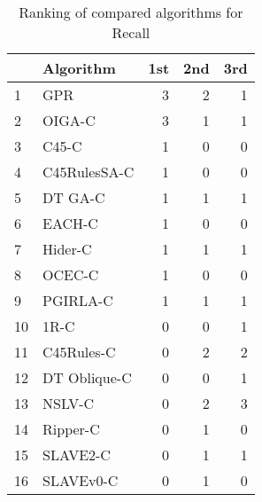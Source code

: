\begin{table}
\footnotesize
\caption{Ranking of compared algorithms for Recall}
\label{tab:places Recall}
\begin{tabular}{llrrr}
\hline
 & Algorithm & 1st & 2nd & 3rd \\
\hline
1 & GPR & 3 & 2 & 1 \\
2 & OIGA-C & 3 & 1 & 1 \\
3 & C45-C & 1 & 0 & 0 \\
4 & C45RulesSA-C & 1 & 0 & 0 \\
5 & DT GA-C & 1 & 1 & 1 \\
6 & EACH-C & 1 & 0 & 0 \\
7 & Hider-C & 1 & 1 & 1 \\
8 & OCEC-C & 1 & 0 & 0 \\
9 & PGIRLA-C & 1 & 1 & 1 \\
10 & 1R-C & 0 & 0 & 1 \\
11 & C45Rules-C & 0 & 2 & 2 \\
12 & DT Oblique-C & 0 & 0 & 1 \\
13 & NSLV-C & 0 & 2 & 3 \\
14 & Ripper-C & 0 & 1 & 0 \\
15 & SLAVE2-C & 0 & 1 & 1 \\
16 & SLAVEv0-C & 0 & 1 & 0 \\
\hline
\end{tabular}
\end{table}
